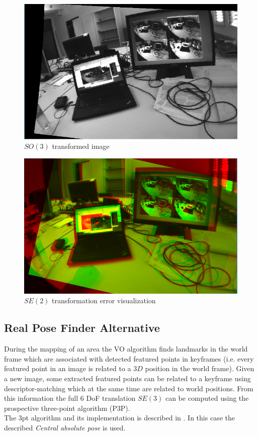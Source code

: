 \begin{figure}[htpb]
  \centering
  \includegraphics[width=0.6\linewidth]{img/so3_transformation_1.png}
  \caption{$SO(3)$ transformed image}
  \label{fig:so3_transformation_1}
\end{figure}

\begin{figure}[htpb]
  \centering
  \includegraphics[width=0.6\linewidth]{img/se2_error_1.png}
  \caption{$SE(2)$ transformation error visualization}
  \label{fig:se3_error_1}
\end{figure}


\subsection{Real Pose Finder Alternative}
\label{sub:real_pose_finder_alternative}

During the mapping of an area the VO algorithm finds landmarks in the world frame which are associated with detected featured points in keyframes (i.e. every featured point in an image is related to a $3D$ position in the world frame). Given a new image, some extracted featured points can be related to a keyframe using descriptor-matching which at the same time are related to world positions. From this information the full 6 DoF translation $SE(3)$ can be computed using the prospective three-point algorithm (P3P).\\

The 3pt algorithm and its implementation is described in \cite{kneipopengv}. In this case the described \textit{Central absolute pose} is used.

